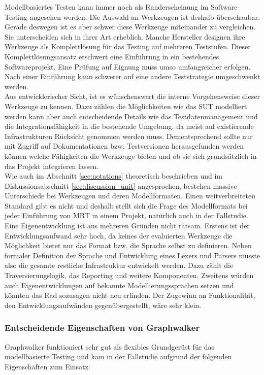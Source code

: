 Modellbasiertes Testen kann immer noch als Randerscheinung im Software-Testing angesehen werden. Die Auswahl an Werkzeugen ist deshalb überschaubar. Gerade deswegen ist es aber schwer diese Werkzeuge miteinander zu vergleichen. Sie unterscheiden sich in ihrer Art erheblich. Manche Hersteller designen ihre Werkzeuge als Komplettlösung für das Testing auf mehreren Teststufen. Dieser Komplettlösungsansatz erschwert eine Einführung in ein bestehendes Softwareprojekt. Eine Prüfung auf Eignung muss umso umfangreicher erfolgen. Nach einer Einführung kann schwerer auf eine andere Teststrategie umgeschwenkt werden.\\
Aus entwicklerischer Sicht, ist es wünschenswert die interne Vorgehensweise dieser Werkzeuge zu kennen. Dazu zählen die Möglichkeiten wie das \Gls{SUT} modelliert werden kann aber auch entscheidende Details wie das Testdatenmanagement und die Integrationsfähigkeit in die bestehende Umgebung, da meist auf existierende Infrastrukturen Rücksicht genommen werden muss. Dementsprechend sollte nur mit Zugriff auf Dokumentationen bzw. Testversionen herausgefunden werden können welche Fähigkeiten die Werkzeuge bieten und ob sie sich grundsätzlich in das Projekt integrieren lassen.\\
Wie auch im Abschnitt \ref{sec:notations} theoretisch beschrieben und im Diskussionsabschnitt \ref{sec:discussion_unit} angesprochen, bestehen massive Unterschiede bei Werkzeugen und deren Modellformaten. Einen weitverbreiteten Standard gibt es nicht und deshalb stellt sich die Frage des Modellformats bei jeder Einführung von \Gls{MBT} in einem Projekt, natürlich auch in der Fallstudie. Eine Eigenentwicklung ist aus mehreren Gründen nicht ratsam. Erstens ist der Entwicklungsaufwand sehr hoch, da keines der evaluierten Werkzeuge die Möglichkeit bietet nur das Format bzw. die Sprache selbst zu definieren. Neben formaler Definition der Sprache und Entwicklung eines Lexers und Parsers müsste also die gesamte restliche Infrastruktur entwickelt werden. Dazu zählt die Traversierungslogik, das Reporting und weitere Komponenten. Zweitens würden auch Eigenentwicklungen auf bekannte Modellierungssprachen setzen und könnten das Rad sozusagen nicht neu erfinden. Der Zugewinn an Funktionalität, den Entwicklungsaufwänden gegenübergestellt, wäre sehr klein.\\


\subsubsection{Entscheidende Eigenschaften von Graphwalker}
Graphwalker funktioniert sehr gut als flexibles Grundgerüst für das modellbasierte Testing und kam in der Fallstudie aufgrund der folgenden Eigenschaften zum Einsatz:

